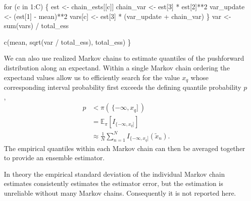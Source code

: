 \documentclass[
  letterpaper,
  DIV=11,
  numbers=noendperiod]{scrartcl}
\newenvironment{Shaded}{\begin{snugshade}}{\end{snugshade}}
\newcommand{\BuiltInTok}[1]{\textcolor[rgb]{0.00,0.23,0.31}{#1}}
\newcommand{\ControlFlowTok}[1]{\textcolor[rgb]{0.00,0.23,0.31}{#1}}
\newcommand{\DecValTok}[1]{\textcolor[rgb]{0.68,0.00,0.00}{#1}}
\newcommand{\KeywordTok}[1]{\textcolor[rgb]{0.00,0.23,0.31}{#1}}
\newcommand{\NormalTok}[1]{\textcolor[rgb]{0.00,0.23,0.31}{#1}}
\newcommand{\OperatorTok}[1]{\textcolor[rgb]{0.37,0.37,0.37}{#1}}
\begin{document}
\begin{Shaded}
\begin{Highlighting}[]
  \ControlFlowTok{for}\NormalTok{ (c }\KeywordTok{in} \DecValTok{1}\NormalTok{:C) \{}
\NormalTok{    est }\OperatorTok{\textless{}{-}}\NormalTok{ chain\_ests[[c]]}
\NormalTok{    chain\_var }\OperatorTok{\textless{}{-}}\NormalTok{ est[}\DecValTok{3}\NormalTok{] }\OperatorTok{*}\NormalTok{ est[}\DecValTok{2}\NormalTok{]}\OperatorTok{**}\DecValTok{2}
\NormalTok{    var\_update }\OperatorTok{\textless{}{-}}\NormalTok{ (est[}\DecValTok{1}\NormalTok{] }\OperatorTok{{-}}\NormalTok{ mean)}\OperatorTok{**}\DecValTok{2}
    \BuiltInTok{vars}\NormalTok{[c] }\OperatorTok{\textless{}{-}}\NormalTok{ est[}\DecValTok{3}\NormalTok{] }\OperatorTok{*}\NormalTok{ (var\_update }\OperatorTok{+}\NormalTok{ chain\_var)}
\NormalTok{  \}}
\NormalTok{  var }\OperatorTok{\textless{}{-}} \BuiltInTok{sum}\NormalTok{(}\BuiltInTok{vars}\NormalTok{) }\OperatorTok{/}\NormalTok{ total\_ess}
  
\NormalTok{  c(mean, sqrt(var }\OperatorTok{/}\NormalTok{ total\_ess), total\_ess)}
\NormalTok{\}}
\end{Highlighting}
\end{Shaded}

We can also use realized Markov chains to estimate quantiles of the
pushforward distribution along an expectand. Within a single Markov
chain ordering the expectand values allow us to efficiently search for
the value \(x_{q}\) whose corresponding interval probability first
exceeds the defining quantile probability \(p\), \begin{align*}
p
&<
\pi( \, \{ -\infty, x_{q} ] \, )
\\
&=
\mathbb{E}_{\pi} \left[ I_{ \{ -\infty, x_{q} ] } \right]
\\
&\approx
\frac{1}{N} \sum_{n = 1}^{N} I_{ \{ -\infty,  x_{q} ] }( \tilde{x}_{n}).
\end{align*} The empirical quantiles within each Markov chain can then
be averaged together to provide an ensemble estimator.

In theory the empirical standard deviation of the individual Markov
chain estimates consistently estimates the estimator error, but the
estimation is unreliable without many Markov chains. Consequently it is
not reported here.
\end{document}
